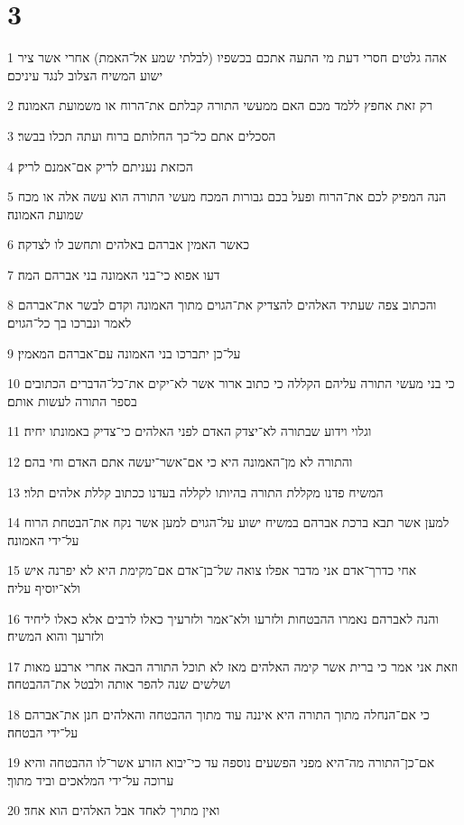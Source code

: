 \chapter{3}

\par 1 אהה גלטים חסרי דעת מי התעה אתכם בכשפיו (לבלתי שמע אל־האמת) אחרי אשר ציר ישוע המשיח הצלוב לנגד עיניכם׃
\par 2 רק זאת אחפץ ללמד מכם האם ממעשי התורה קבלתם את־הרוח או משמועת האמונה׃
\par 3 הסכלים אתם כל־כך החלותם ברוח ועתה תכלו בבשר׃
\par 4 הכזאת נעניתם לריק אם־אמנם לריק׃
\par 5 הנה המפיק לכם את־הרוח ופעל בכם גבורות המכח מעשי התורה הוא עשה אלה או מכח שמועת האמונה׃
\par 6 כאשר האמין אברהם באלהים ותחשב לו לצדקה׃
\par 7 דעו אפוא כי־בני האמונה בני אברהם המה׃
\par 8 והכתוב צפה שעתיד האלהים להצדיק את־הגוים מתוך האמונה וקדם לבשר את־אברהם לאמר ונברכו בך כל־הגוים׃
\par 9 על־כן יתברכו בני האמונה עם־אברהם המאמין׃
\par 10 כי בני מעשי התורה עליהם הקללה כי כתוב ארור אשר לא־יקים את־כל־הדברים הכתובים בספר התורה לעשות אותם׃
\par 11 וגלוי וידוע שבתורה לא־יצדק האדם לפני האלהים כי־צדיק באמונתו יחיה׃
\par 12 והתורה לא מן־האמונה היא כי אם־אשר־יעשה אתם האדם וחי בהם׃
\par 13 המשיח פדנו מקללת התורה בהיותו לקללה בעדנו ככתוב קללת אלהים תלוי׃
\par 14 למען אשר תבא ברכת אברהם במשיח ישוע על־הגוים למען אשר נקח את־הבטחת הרוח על־ידי האמונה׃
\par 15 אחי כדרך־אדם אני מדבר אפלו צואה של־בן־אדם אם־מקימת היא לא יפרנה איש ולא־יוסיף עליה׃
\par 16 והנה לאברהם נאמרו ההבטחות ולזרעו ולא־אמר ולזרעיך כאלו לרבים אלא כאלו ליחיד ולזרעך והוא המשיח׃
\par 17 וזאת אני אמר כי ברית אשר קימה האלהים מאז לא תוכל התורה הבאה אחרי ארבע מאות ושלשים שנה להפר אותה ולבטל את־ההבטחה׃
\par 18 כי אם־הנחלה מתוך התורה היא איננה עוד מתוך ההבטחה והאלהים חנן את־אברהם על־ידי הבטחה׃
\par 19 אם־כן־התורה מה־היא מפני הפשעים נוספה עד כי־יבוא הזרע אשר־לו ההבטחה והיא ערוכה על־ידי המלאכים וביד מתוך׃
\par 20 ואין מתויך לאחד אבל האלהים הוא אחד׃
